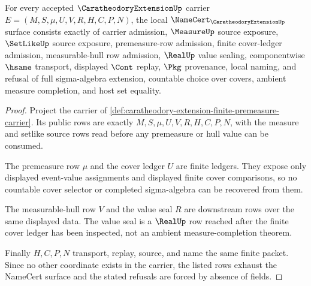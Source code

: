 \begin{theorem}
\label{thm:caratheodory-extension-finite-premeasure-obligations}
For every accepted $\CaratheodoryExtensionUp$ carrier $E=(M,S,\mu,U,V,R,H,C,P,N)$, the local $\NameCert_{\CaratheodoryExtensionUp}$ surface consists exactly of carrier admission, $\MeasureUp$ source exposure, $\SetLikeUp$ source exposure, premeasure-row admission, finite cover-ledger admission, measurable-hull row admission, $\RealUp$ value sealing, componentwise $\hsame$ transport, displayed $\Cont$ replay, $\Pkg$ provenance, local naming, and refusal of full sigma-algebra extension, countable choice over covers, ambient measure completion, and host set equality.
\end{theorem}
\begin{proof}
Project the carrier of \autoref{def:caratheodory-extension-finite-premeasure-carrier}. Its public rows are exactly $M,S,\mu,U,V,R,H,C,P,N$, with the measure and setlike source rows read before any premeasure or hull value can be consumed.

The premeasure row $\mu$ and the cover ledger $U$ are finite ledgers. They expose only displayed event-value assignments and displayed finite cover comparisons, so no countable cover selector or completed sigma-algebra can be recovered from them.

The measurable-hull row $V$ and the value seal $R$ are downstream rows over the same displayed data. The value seal is a $\RealUp$ row reached after the finite cover ledger has been inspected, not an ambient measure-completion theorem.

Finally $H,C,P,N$ transport, replay, source, and name the same finite packet. Since no other coordinate exists in the carrier, the listed rows exhaust the NameCert surface and the stated refusals are forced by absence of fields.
\end{proof}



